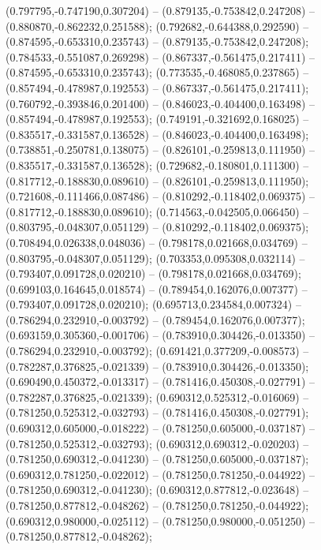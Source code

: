  (0.797795,-0.747190,0.307204) -- (0.879135,-0.753842,0.247208) -- (0.880870,-0.862232,0.251588);
 (0.792682,-0.644388,0.292590) -- (0.874595,-0.653310,0.235743) -- (0.879135,-0.753842,0.247208);
 (0.784533,-0.551087,0.269298) -- (0.867337,-0.561475,0.217411) -- (0.874595,-0.653310,0.235743);
 (0.773535,-0.468085,0.237865) -- (0.857494,-0.478987,0.192553) -- (0.867337,-0.561475,0.217411);
 (0.760792,-0.393846,0.201400) -- (0.846023,-0.404400,0.163498) -- (0.857494,-0.478987,0.192553);
 (0.749191,-0.321692,0.168025) -- (0.835517,-0.331587,0.136528) -- (0.846023,-0.404400,0.163498);
 (0.738851,-0.250781,0.138075) -- (0.826101,-0.259813,0.111950) -- (0.835517,-0.331587,0.136528);
 (0.729682,-0.180801,0.111300) -- (0.817712,-0.188830,0.089610) -- (0.826101,-0.259813,0.111950);
 (0.721608,-0.111466,0.087486) -- (0.810292,-0.118402,0.069375) -- (0.817712,-0.188830,0.089610);
 (0.714563,-0.042505,0.066450) -- (0.803795,-0.048307,0.051129) -- (0.810292,-0.118402,0.069375);
 (0.708494,0.026338,0.048036) -- (0.798178,0.021668,0.034769) -- (0.803795,-0.048307,0.051129);
 (0.703353,0.095308,0.032114) -- (0.793407,0.091728,0.020210) -- (0.798178,0.021668,0.034769);
 (0.699103,0.164645,0.018574) -- (0.789454,0.162076,0.007377) -- (0.793407,0.091728,0.020210);
 (0.695713,0.234584,0.007324) -- (0.786294,0.232910,-0.003792) -- (0.789454,0.162076,0.007377);
 (0.693159,0.305360,-0.001706) -- (0.783910,0.304426,-0.013350) -- (0.786294,0.232910,-0.003792);
 (0.691421,0.377209,-0.008573) -- (0.782287,0.376825,-0.021339) -- (0.783910,0.304426,-0.013350);
 (0.690490,0.450372,-0.013317) -- (0.781416,0.450308,-0.027791) -- (0.782287,0.376825,-0.021339);
 (0.690312,0.525312,-0.016069) -- (0.781250,0.525312,-0.032793) -- (0.781416,0.450308,-0.027791);
 (0.690312,0.605000,-0.018222) -- (0.781250,0.605000,-0.037187) -- (0.781250,0.525312,-0.032793);
 (0.690312,0.690312,-0.020203) -- (0.781250,0.690312,-0.041230) -- (0.781250,0.605000,-0.037187);
 (0.690312,0.781250,-0.022012) -- (0.781250,0.781250,-0.044922) -- (0.781250,0.690312,-0.041230);
 (0.690312,0.877812,-0.023648) -- (0.781250,0.877812,-0.048262) -- (0.781250,0.781250,-0.044922);
 (0.690312,0.980000,-0.025112) -- (0.781250,0.980000,-0.051250) -- (0.781250,0.877812,-0.048262);
